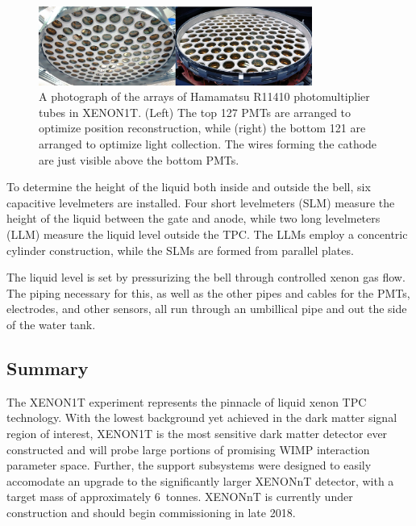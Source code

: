 \begin{figure}[htb]
\centering
    \includegraphics[width=0.8\textwidth]{figures/xe1t/pmt_arrays}
    \caption{A photograph of the arrays of Hamamatsu R11410 photomultiplier tubes in XENON1T. (Left) The top 127 PMTs are arranged to optimize position reconstruction, while (right) the bottom 121 are arranged to optimize light collection. The wires forming the cathode are just visible above the bottom PMTs.}\label{fig:pmt_arrays}
\end{figure}

To determine the height of the liquid both inside and outside the bell, six capacitive levelmeters are installed. Four short levelmeters (SLM) measure the height of the liquid between the gate and anode, while two long levelmeters (LLM) measure the liquid level outside the TPC. The LLMs employ a concentric cylinder construction, while the SLMs are formed from parallel plates.

The liquid level is set by pressurizing the bell through controlled xenon gas flow. The piping necessary for this, as well as the other pipes and cables for the PMTs, electrodes, and other sensors, all run through an umbillical pipe and out the side of the water tank.

\subsection{Summary}

The XENON1T experiment represents the pinnacle of liquid xenon TPC technology. With the lowest background yet achieved in the dark matter signal region of interest, XENON1T is the most sensitive dark matter detector ever constructed and will probe large portions of promising WIMP interaction parameter space. Further, the support subsystems were designed to easily accomodate an upgrade to the significantly larger XENONnT detector, with a target mass of approximately 6~tonnes. XENONnT is currently under construction and should begin commissioning in late 2018.